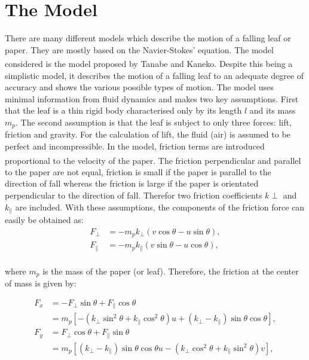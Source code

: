 \section{The Model}

There are many different models which describe the motion of a falling leaf or paper. They are mostly based on the Navier-Stokes’ equation.  The model considered is the model proposed by  Tanabe and Kaneko\textsuperscript{\cite{tanabe1994behavior}}. Despite this being a simplistic model, it describes the motion of a falling leaf to an adequate degree of accuracy and shows the various possible types of motion. The model uses minimal information from fluid dynamics and makes two key assumptions. First that the leaf is a thin rigid body characterised only by its length $l$ and its mass $m_{p}$. The second assumption is that the leaf is subject to only three forces: lift, friction and gravity. For the calculation of lift, the fluid (air) is assumed to be perfect and incompressible. In the model, friction terms are introduced proportional to the velocity of the paper\textsuperscript{\cite{stokesApprox}}. The friction perpendicular and parallel to the paper are not equal, friction is small if the paper is parallel to the direction of fall whereas the friction is large if the paper is orientated perpendicular to the direction of fall. Therefor two friction coefficients $k{\perp}$ and $k_{\parallel}$ are included. With these assumptions, the components of the friction force can easily be obtained as:
\begin{equation*}
\begin{split}
F_{\perp} & = -m_{p}k_{\perp}(v\cos\theta-u\sin\theta), \\
F_{\parallel} & = -m_{p}k_{\parallel}(v\sin\theta-u\cos\theta), \\
\end{split}
\end{equation*}

where $m_{p}$ is the mass of the paper (or leaf). Therefore, the friction at the center of mass is given by:

\begin{equation}
\begin{split}
F_{x} & = -F_{\perp}\sin\theta + F_{\parallel}\cos\theta \\
& = m_{p}[-(k_{\perp}\sin^{2}\theta + k_{\parallel}\cos^{2}\theta)u + (k_{\perp}-k_{\parallel})\sin\theta \cos\theta], \\
F_{y} &  =  F_{\perp}\cos\theta + F_{\parallel}\sin\theta \\
& = m_{p}[(k_{\perp}-k_{\parallel})\sin\theta \cos\theta u - (k_{\perp}\cos^{2}\theta + k_{\parallel}\sin^{2}\theta)v],
\end{split}
\end{equation}

